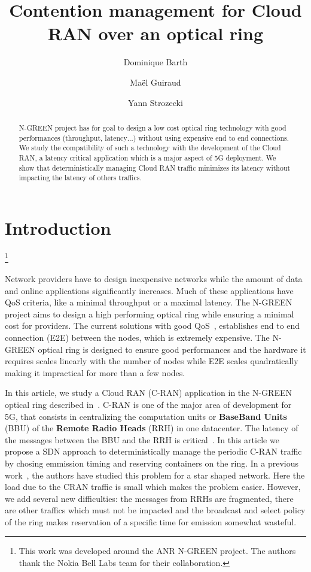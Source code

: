 \documentclass[]{algotel}
\title{Contention management for Cloud RAN over an optical ring}
\author{Dominique Barth\addressmark{1}
  \and Ma\"el Guiraud\addressmark{1}
   \and Yann Strozecki\addressmark{1}
  }
\begin{document}
\maketitle


\begin{abstract}

N-GREEN project has for goal to design a low cost optical ring technology with good performances (throughput, latency$\dots$) without using expensive end to end connections. We study the compatibility of such a technology with the development of the Cloud RAN, a latency critical application which is a major aspect of 5G deployment. We show that deterministically managing Cloud RAN traffic minimizes its latency without impacting the latency of others traffics. 
\end{abstract}


\section{Introduction}
 \footnote{ This work was developed around the ANR N-GREEN project. The authors thank the Nokia Bell Labs team for their collaboration.} 

Network providers have to design inexpensive networks while the amount of data and online applications significantly increases. Much of these applications have QoS criteria, like a minimal throughput or a maximal latency. The N-GREEN project aims to design a high performing optical ring while ensuring a minimal cost for providers. The current solutions with good QoS~\cite{pizzinat2015things}, establishes end to end connection (E2E) between the nodes, which is extremely expensive. The N-GREEN optical ring is designed to ensure good performances and the hardware it requires scales linearly with the number of nodes while E2E scales quadratically making it impractical for more than a few nodes.

In this article, we study a Cloud RAN (C-RAN) application in the N-GREEN optical ring described in~\cite{ngreenarchitecture}. C-RAN is one of the major area of development for 5G, that consists in centralizing the computation units or {\bf BaseBand Units} (BBU) of the {\bf Remote Radio Heads} (RRH) in one datacenter. The latency of the messages between the BBU and the RRH is critical~\cite{bouguen2012lte,3gpp5g}. In this article we propose a SDN approach to deterministically manage the periodic C-RAN traffic by chosing emmission timing and reserving containers on the ring. In a previous work~\cite{dominique2018deterministic}, the authors have studied this problem for a star shaped network. Here the load due to the CRAN traffic is small which makes the problem easier. However, we add several new difficulties: the messages from RRHs are fragmented, there are other traffics which must not be impacted and the broadcast and select policy of the ring makes reservation of a specific time for emission somewhat wasteful. 
\end{document}
